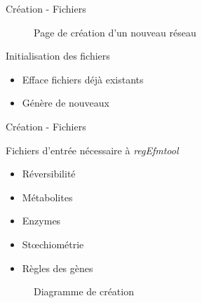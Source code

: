 \documentclass{beamer}
\begin{document}
\begin{frame}{\textcolor{bleu2}{\hspace{1cm}Création - Fichiers}}
	\begin{figure}[!ht]
		\begin{center}
			\caption{Page de création d'un nouveau réseau}
			\end{center}
	\end{figure}
	\begin{center}
		\begin{minipage}[c]{0.9\textwidth}
			\begin{block}{\hspace{0.2cm}Initialisation des fichiers}
				\begin{itemize}
					\item Efface fichiers déjà existants
					\item Génère de nouveaux
				\end{itemize}
			\end{block}
		\end{minipage}
	\end{center}
\end{frame}

\begin{frame}{\textcolor{bleu2}{\hspace{1cm}Création - Fichiers}}
	\begin{center}
		\begin{minipage}[c]{0.9\textwidth}
			\begin{block}{\hspace{0.2cm}Fichiers d'entrée nécessaire à \emph{regEfmtool}}
				\begin{itemize}
					\item Réversibilité
					\item Métabolites
					\item Enzymes
					\item Stœchiométrie
					\item Règles des gènes
				\end{itemize}
			\end{block}
		\end{minipage}
	\end{center}
	\begin{figure}[!ht]
		\begin{center}
			\caption{Diagramme de création}
  		\end{center}
	\end{figure}
\end{frame}
\end{document}
